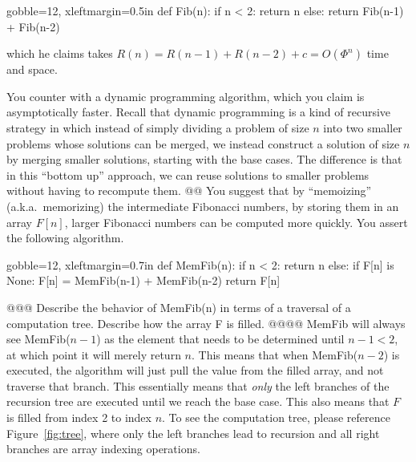 \documentclass[10pt]{article}
\begin{document}
\begin{easylist}[enumerate]
        \begin{pythoncode*}{gobble=12, xleftmargin=0.5in}
            def Fib(n):
                if n < 2:
                    return n
                else:
                    return Fib(n-1) + Fib(n-2)
        \end{pythoncode*}

    which he claims takes $R(n) = R(n - 1) + R(n - 2) + c = O(\Phi^n)$ time and space.\newline

    You counter with a dynamic programming algorithm, which you claim is asymptotically faster. Recall that dynamic
    programming is a kind of recursive strategy in which instead of simply dividing a problem of size $n$ into two
    smaller problems whose solutions can be merged, we instead construct a solution of size $n$ by merging smaller
    solutions, starting with the base cases. The difference is that in this ``bottom up'' approach, we can reuse
    solutions to smaller problems without having to recompute them.
    @@ You suggest that by ``memoizing'' (a.k.a.\ memorizing) the intermediate Fibonacci numbers, by storing them in an
    array $F[n]$, larger Fibonacci numbers can be computed more quickly. You assert the following algorithm.

        \begin{pythoncode*}{gobble=12, xleftmargin=0.7in}
            def MemFib(n):
                if n < 2:
                    return n
                else:
                    if F[n] is None:
                        F[n] = MemFib(n-1) + MemFib(n-2)
                    return F[n]
        \end{pythoncode*}

    @@@ Describe the behavior of MemFib(n) in terms of a traversal of a computation tree. Describe how the array F is
    filled.
    @@@@ MemFib will always see MemFib($n-1$) as the element that needs to be determined until $n - 1 < 2$, at which
    point it will merely return $n$. This means that when MemFib($n - 2$) is executed, the algorithm will just pull the
    value from the filled array, and not traverse that branch. This essentially means that \textit{only} the left
    branches of the recursion tree are executed until we reach the base case. This also means that $F$ is filled from
    index 2 to index $n$. To see the computation tree, please reference Figure~\ref{fig:tree}, where only the left
    branches lead to recursion and all right branches are array indexing operations.


\end{easylist}
\end{document}

